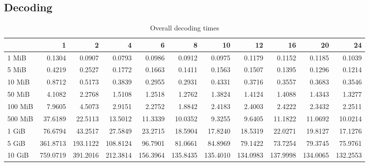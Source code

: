 \subsection{Decoding}
\begin{table}[!h]
	\caption{Overall decoding times}
	\begin{tabular}{lrrrrrrrrrr}
		\toprule
		\diagbox{File sizes }{Threads} &        1  &        2  &        4  &        6  &        8  &        10 &        12 &        16 &        20 &        24 \\
		\midrule
		1 MiB   &    0.1304 &    0.0907 &    0.0793 &    0.0986 &    0.0912 &    0.0975 &    0.1179 &    0.1152 &    0.1185 &    0.1039 \\
		5 MiB   &    0.4219 &    0.2527 &    0.1772 &    0.1663 &    0.1411 &    0.1563 &    0.1507 &    0.1395 &    0.1296 &    0.1214 \\
		10 MiB  &    0.8712 &    0.5173 &    0.3839 &    0.2955 &    0.2931 &    0.4331 &    0.3716 &    0.3557 &    0.3683 &    0.3546 \\
		50 MiB  &    4.1082 &    2.2768 &    1.5108 &    1.2518 &    1.2762 &    1.3824 &    1.4124 &    1.4088 &    1.4343 &    1.3277 \\
		100 MiB &    7.9605 &    4.5073 &    2.9151 &    2.2752 &    1.8842 &    2.4183 &    2.4003 &    2.4222 &    2.3432 &    2.2511 \\
		500 MiB &   37.6189 &   22.5113 &   13.5012 &   11.3339 &   10.0352 &    9.3255 &    9.6405 &   11.1822 &   11.0692 &   10.0214 \\
		1 GiB   &   76.6794 &   43.2517 &   27.5849 &   23.2715 &   18.5904 &   17.8240 &   18.5319 &   22.0271 &   19.8127 &   17.1276 \\
		5 GiB   &  361.8713 &  193.1122 &  108.8124 &   96.7901 &   81.0661 &   84.8969 &   79.1422 &   73.7254 &   79.3745 &   75.9761 \\
		10 GiB  &  759.0719 &  391.2016 &  212.3814 &  156.3964 &  135.8435 &  135.4010 &  134.0983 &  137.9998 &  134.0065 &  132.2553 \\
		\bottomrule
	\end{tabular}
\end{table}


